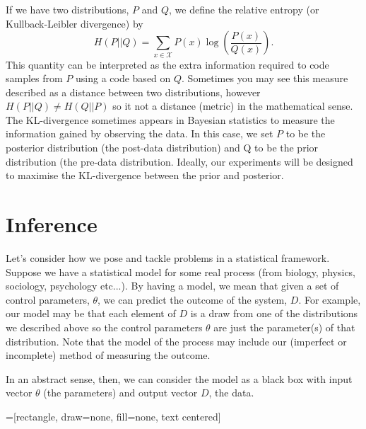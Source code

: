 \documentclass[11pt]{article}
\begin{document}
If we have two distributions, $P$ and $Q$, we define the relative entropy (or Kullback-Leibler divergence) by 
\[H(P || Q) = \sum_{x \in \mathcal{X}} P(x) \log \left( \frac{P(x)}{Q(x)} \right). \]
This quantity can be interpreted as the extra information required to code samples from $P$ using a code based on $Q$.
Sometimes you may see this measure described as a distance between two distributions, however $H(P||Q) \neq H(Q||P)$ so it not a distance (metric) in the mathematical sense.    The KL-divergence sometimes appears in Bayesian statistics to measure the information  gained by observing the data.  In this case,  we set $P$ to be the posterior distribution (the post-data distribution) and  Q to be the prior distribution (the pre-data distribution.   Ideally, our experiments will be designed to maximise the KL-divergence between the prior and posterior.



 
 \section{Inference}


Let's consider how we pose and tackle problems in a statistical framework.   Suppose we have a statistical model for some real process (from biology, physics, sociology, psychology etc...).  By having a model, we mean that given a set of control parameters, $\theta$, we can predict the outcome of the system, $D$.  For example, our model may be that each element of $D$ is a draw from one of the distributions we described above so the control parameters $\theta$ are just the parameter(s) of that distribution.  Note that the model of the process may include our (imperfect or incomplete) method of measuring the outcome.  



In an abstract sense, then, we can consider the model as a black box with input vector $\theta$ (the parameters) and output vector $D$, the data.   

=[rectangle, draw=none, fill=none, text centered]
  \\
\end{document}
